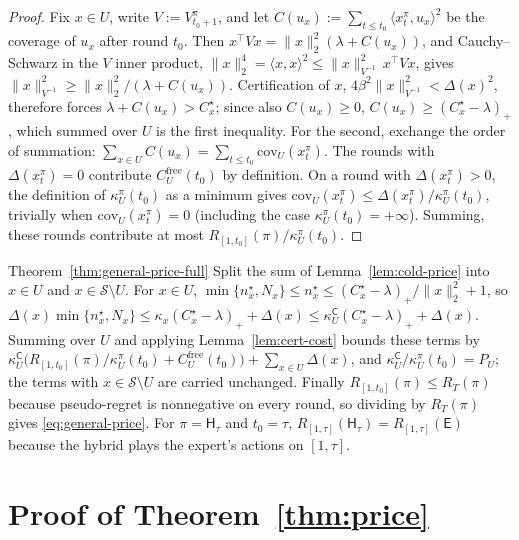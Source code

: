 \documentclass[anon]{alt2027} %
\newcommand{\Cold}{\mathsf{C}}
\newcommand{\Exp}{\mathsf{E}}
\newcommand{\Hyb}{\mathsf{H}}
\begin{document}
\begin{proof}
Fix $x\in U$, write $V:=V^\pi_{t_0+1}$, and let
$C(u_x):=\sum_{t\le t_0}\langle x^\pi_t,u_x\rangle^2$ be the coverage of $u_x$
after round $t_0$. Then $x^\top Vx=\|x\|_2^2(\lambda+C(u_x))$, and
Cauchy--Schwarz in the $V$ inner product,
$\|x\|_2^4=\langle x,x\rangle^2\le\|x\|^2_{V^{-1}}\,x^\top Vx$, gives
$\|x\|^2_{V^{-1}}\ge\|x\|_2^2/(\lambda+C(u_x))$. Certification of $x$,
$4\beta^2\|x\|^2_{V^{-1}}<\Delta(x)^2$, therefore forces
$\lambda+C(u_x)>C^\star_x$; since also $C(u_x)\ge0$, $C(u_x)\ge(C^\star_x-\lambda)_+$,
which summed over $U$ is the first inequality. For the second, exchange the
order of summation: $\sum_{x\in U}C(u_x)=\sum_{t\le t_0}\mathrm{cov}_U(x^\pi_t)$.
The rounds with $\Delta(x^\pi_t)=0$ contribute $C^{\mathrm{free}}_U(t_0)$ by
definition. On a round with $\Delta(x^\pi_t)>0$, the definition of
$\kappa^\pi_U(t_0)$ as a minimum gives
$\mathrm{cov}_U(x^\pi_t)\le\Delta(x^\pi_t)/\kappa^\pi_U(t_0)$, trivially when
$\mathrm{cov}_U(x^\pi_t)=0$ (including the case $\kappa^\pi_U(t_0)=+\infty$).
Summing, these rounds contribute at most $R_{[1,t_0]}(\pi)/\kappa^\pi_U(t_0)$.
\end{proof}

\begin{proofof}{Theorem~\ref{thm:general-price-full}}
Split the sum of Lemma~\ref{lem:cold-price} into $x\in U$ and $x\in \mathcal S\setminus U$. For
$x\in U$, $\min\{n^\star_x,N_x\}\le n^\star_x\le(C^\star_x-\lambda)_+/\|x\|_2^2+1$, so
$\Delta(x)\min\{n^\star_x,N_x\}\le\kappa_x(C^\star_x-\lambda)_++\Delta(x)\le\kappa^{\Cold}_U(C^\star_x-\lambda)_++\Delta(x)$.
Summing over $U$ and applying Lemma~\ref{lem:cert-cost} bounds these terms by
$\kappa^{\Cold}_U\bigl(R_{[1,t_0]}(\pi)/\kappa^\pi_U(t_0)+C^{\mathrm{free}}_U(t_0)\bigr)+\sum_{x\in U}\Delta(x)$,
and $\kappa^{\Cold}_U/\kappa^\pi_U(t_0)=P_U$; the terms with $x\in \mathcal S\setminus U$
are carried unchanged. Finally $R_{[1,t_0]}(\pi)\le R_T(\pi)$ because
pseudo-regret is nonnegative on every round, so dividing by $R_T(\pi)$ gives
\eqref{eq:general-price}. For $\pi=\Hyb_\tau$
and $t_0=\tau$, $R_{[1,\tau]}(\Hyb_\tau)=R_{[1,\tau]}(\Exp)$ because the
hybrid plays the expert's actions on $[1,\tau]$.
\end{proofof}

\section{Proof of Theorem~\ref{thm:price}}
\label{app:catalog}
\end{document}
